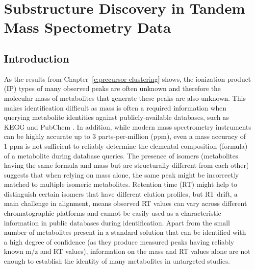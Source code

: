 \chapter{Substructure Discovery in Tandem Mass Spectometry Data}
\label{c:lda}

\section{Introduction}

As the results from Chapter~\ref{c:precursor-clustering} shows, the ionization product (IP) types of many observed peaks are often unknown and therefore the molecular mass of metabolites that generate these peaks are also unknown. This makes identification difficult as mass is often a required information when querying metabolite identities against publicly-available databases, such as KEGG \cite{kotera2012kegg} and PubChem \cite{bolton2008pubchem}. In addition, while modern mass spectrometry instruments can be highly accurate up to 3 parts-per-million (ppm), even a mass accuracy of 1 ppm is not sufficient to reliably determine the elemental composition (formula) of a metabolite \cite{Kind2007} during database queries. The presence of isomers (metabolites having the same formula and mass but are structurally different from each other) suggests that when relying on mass alone, the same peak might be incorrectly matched to multiple isomeric metabolites. Retention time (RT) might help to distinguish certain isomers that have different elution profiles, but RT drift, a main challenge in alignment, means observed RT values can vary across different chromatographic platforms and cannot be easily used as a characteristic information in public databases during identification. Apart from the small number of metabolites present in a standard solution that can be identified with a high degree of confidence (as they produce measured peaks having reliably known m/z and RT values), information on the mass and RT values alone are not enough to establish the identity of many metabolites in untargeted studies. 

